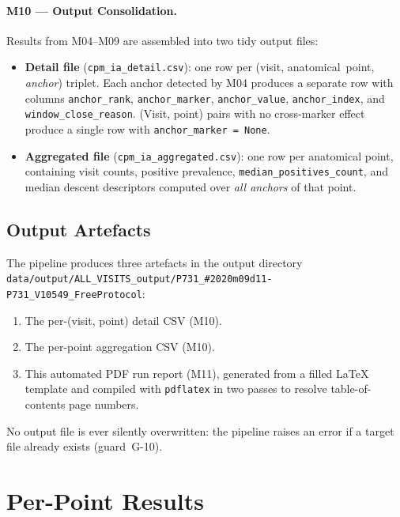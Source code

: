 \documentclass[a4paper,11pt]{article}
\begin{document}
\paragraph{M10 --- Output Consolidation.}
Results from M04--M09 are assembled into two tidy output files:
\begin{itemize}
  \item \textbf{Detail file} (\texttt{cpm\_ia\_detail.csv}): one row per
        (visit, anatomical~point, \emph{anchor}) triplet. Each anchor detected by M04
        produces a separate row with columns \texttt{anchor\_rank},
        \texttt{anchor\_marker}, \texttt{anchor\_value}, \texttt{anchor\_index},
        and \texttt{window\_close\_reason}.
        (Visit, point) pairs with no cross-marker effect produce a single row with
        \texttt{anchor\_marker = None}.
  \item \textbf{Aggregated file} (\texttt{cpm\_ia\_aggregated.csv}): one row per
        anatomical point, containing visit counts, positive prevalence,
        \texttt{median\_positives\_count}, and median descent descriptors computed over
        \emph{all anchors} of that point.
\end{itemize}

\subsection{Output Artefacts}

The pipeline produces three artefacts in the output directory \texttt{data/output/ALL\_VISITS\_output/P731\_\#2020m09d11-P731\_V10549\_FreeProtocol}:
\begin{enumerate}
  \item The per-(visit, point) detail CSV (M10).
  \item The per-point aggregation CSV (M10).
  \item This automated PDF run report (M11), generated from a filled \LaTeX{} template
        and compiled with \texttt{pdflatex} in two passes to resolve table-of-contents
        page numbers.
\end{enumerate}
No output file is ever silently overwritten: the pipeline raises an error if a target
file already exists (guard~G-10).

\section{Per-Point Results}
\end{document}
